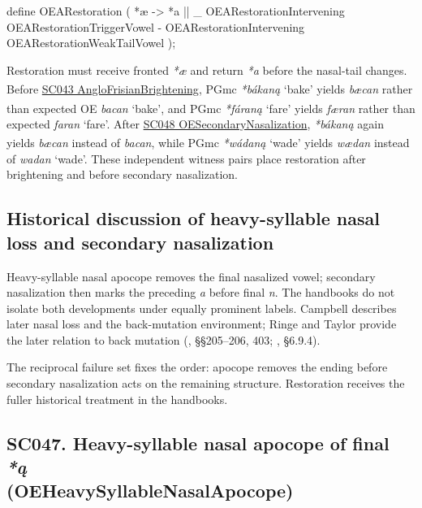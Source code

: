 \documentclass[
  british,
  a4paper,
  openany]{book}
\providecommand{\Pred}[1]{\textsuperscript{\dag}\emph{#1}}
\providecommand{\Recon}[1]{\emph{*#1}}
{\catcode`→=\active \global\def→{\ensuremath{\rightarrow}}}
\providecommand{\texorpdfstring}[2]{#1}
\DeclareRobustCommand{\CAPRRuleHeading}[2]{%
  #1\texorpdfstring{\\(#2)}{ (#2)}%
}
\providecommand{\Pred}[1]{\textsuperscript{\dag}\emph{#1}}
\providecommand{\Recon}[1]{\emph{*#1}}
{\catcode`→=\active \global\def→{\ensuremath{\rightarrow}}}
\begin{document}
\begin{ReaderFacingFoma}
define OEARestoration (
    {*æ} -> {*a} || _
        OEARestorationIntervening OEARestorationTriggerVowel
        - OEARestorationIntervening OEARestorationWeakTailVowel
);
\end{ReaderFacingFoma}

Restoration must receive fronted \emph{*æ} and return \emph{*a} before
the nasal-tail changes. Before
\hyperref[rule-AngloFrisianBrightening]{SC043 AngloFrisianBrightening},
PGmc \Recon{bákaną} `bake' yields \Pred{bæcan} rather than expected OE
\emph{bacan} `bake', and PGmc \Recon{fáraną} `fare' yields \Pred{færan}
rather than expected \emph{faran} `fare'. After
\hyperref[rule-OESecondaryNasalization]{SC048 OESecondaryNasalization},
\Recon{bákaną} again yields \Pred{bæcan} instead of \emph{bacan}, while
PGmc \Recon{wádaną} `wade' yields \Pred{wædan} instead of \emph{wadan}
`wade'. These independent witness pairs place restoration after
brightening and before secondary nasalization.

\subsection{Historical discussion of heavy-syllable nasal loss and
secondary
nasalization}\label{historical-discussion-of-heavy-syllable-nasal-loss-and-secondary-nasalization}

Heavy-syllable nasal apocope removes the final nasalized vowel;
secondary nasalization then marks the preceding \emph{a} before final
\emph{n}. The handbooks do not isolate both developments under equally
prominent labels. Campbell describes later nasal loss and the
back-mutation environment; Ringe and Taylor provide the later relation
to back mutation (,
§§205--206, 403; , §6.9.4).

The reciprocal failure set fixes the order: apocope removes the ending
before secondary nasalization acts on the remaining structure.
Restoration receives the fuller historical treatment in the handbooks.

\subsection{\texorpdfstring{\CAPRRuleHeading{SC047. Heavy-syllable nasal apocope of final \emph{*ą}}{OEHeavySyllableNasalApocope}}{}}\label{rule-OEHeavySyllableNasalApocope}
\end{document}
